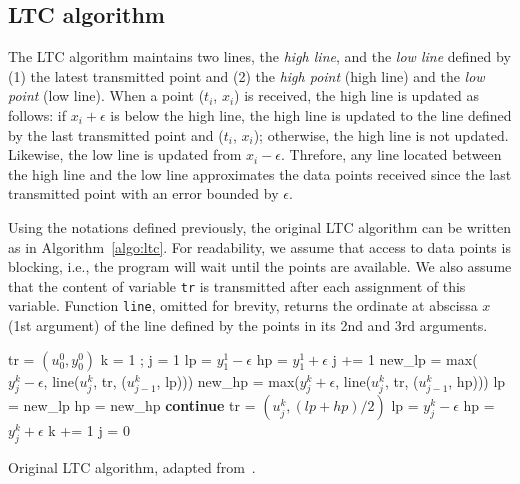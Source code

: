 \documentclass[10pt, conference, compsocconf]{IEEEtran}
\begin{document}
\subsection{LTC algorithm}

The LTC algorithm maintains two lines, the \emph{high line}, and the 
\emph{low line} defined by (1) the latest transmitted point and (2) the 
\emph{high point} (high line) and the \emph{low point} (low line). When 
a point ($t_i$, $x_i$) is received, the high line is updated as 
follows: if $x_i+\epsilon$ is below the high line, the high line is 
updated to the line defined by the last transmitted point and ($t_i$, 
$x_i$); otherwise, the high line is not updated. Likewise, the low line 
is updated from $x_i-\epsilon$. Threfore, any line located between the 
high line and the low line approximates the data points received since 
the last transmitted point with an error bounded by $\epsilon$.

Using the notations defined previously, the original LTC algorithm can 
be written as in Algorithm~\ref{algo:ltc}. For readability, we assume 
that access to data points is blocking, i.e., the program will wait 
until the points are available. We also assume that the content of 
variable \texttt{tr} is transmitted after each assignment of this 
variable. Function \texttt{line}, omitted for brevity, returns the 
ordinate at abscissa $x$ (1st argument) of the line defined by the points
in its 2nd and 3rd arguments.

\begin{algorithm}
\begin{algorithmic}[1]
\State tr = $(u^0_0, y^0_0)$ 
\State k = 1 ; j = 1
\State lp = $y^1_1 - \epsilon$ 
\State hp = $y^1_1 + \epsilon$ 
{} 
    \State j += 1
    \State new\_lp = max($y^k_j-\epsilon$, line($u^k_j$, tr, ($u^k_{j-1}$, lp)))
    \State new\_hp = max($y^k_j+\epsilon$, line($u^k_j$, tr, ($u^k_{j-1}$, hp)))
     
        \State lp = new\_lp
        \State hp = new\_hp
        \State \textbf{continue}
    \EndIf
    \State tr = $(u^k_j, (lp+hp)/2)$
    \State lp = $y^k_j-\epsilon$
    \State hp = $y^k_j+\epsilon$
    \State k += 1
    \State j = 0
\EndWhile
\end{algorithmic}
\caption{Original LTC algorithm, adapted from~\cite{schoellhammer2004lightweight}.}
\label{algo:ltc}
\end{algorithm}
\end{document}
